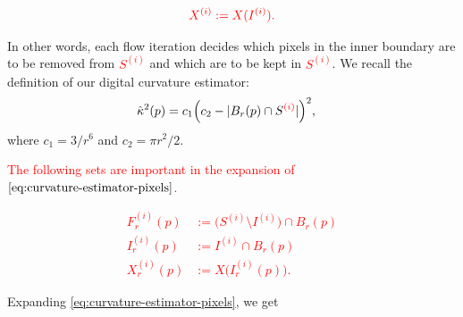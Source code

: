\documentclass[smallextended]{svjour3}       %
\newcommand{\revision}[1]{\textcolor{red}{#1}}
\begin{document}
\begin{align*}
\revision{
	X^{(i)} := X(I^{(i)}).
}
\end{align*}


In other words, each flow iteration decides which pixels in the inner boundary are to be removed from \revision{$S^{(i)}$} and which are to be kept in \revision{$S^{(i)}$}. We recall the definition of our digital curvature estimator:
\begin{align}
	\hat{\kappa}^2(p) &= c_1\Big( c_2 - | B_r(p) \cap S^{\revision{(i)}} | \Big)^2, 
	\label{eq:curvature-estimator-pixels}
\end{align}
where $c_1=3/r^6$ and $c_2=\pi r^2/2$. 

\revision{The following sets are important in the expansion of $\eqref{eq:curvature-estimator-pixels}$.}

\revision{
\begin{align*}
	F_r^{(i)}(p) &:= \big( S^{(i)} \setminus I^{(i)} \big) \cap B_r(p)\\
	I_r^{(i)}(p) &:= I^{(i)} \cap B_r(p) \\
	X_r^{(i)}(p) &:= X\big( I_r^{(i)}(p) \big).
\end{align*}
}

Expanding \eqref{eq:curvature-estimator-pixels}, we get 
\end{document}
